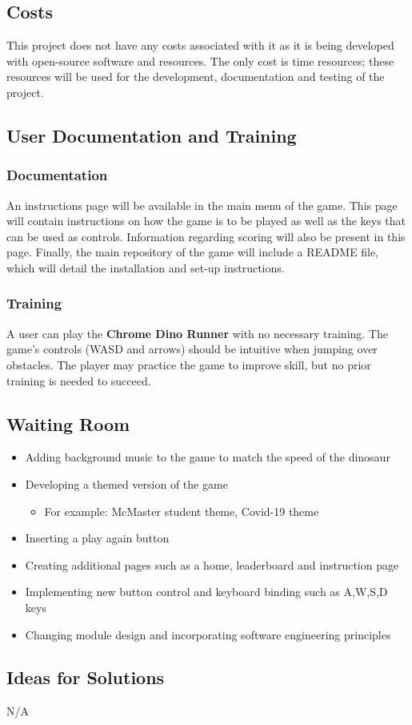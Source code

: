 \documentclass[12pt]{article}
\begin{document}
	\subsection{Costs}
	This project does not have any costs associated with it as it is being developed with open-source software and resources. The only cost is time resources; these resources will be used for the development, documentation and testing of the project. 
	\subsection{User Documentation and Training}
	\subsubsection{Documentation}
	An instructions page will be available in the main menu of the game.
	This page will contain instructions on how the game is to be played as well as the keys that can be used as controls. Information regarding scoring will also be present in this page.
	Finally, the main repository of the game will include a README file, which will detail the installation and set-up instructions.
	\subsubsection{Training}
	A user can play the \textbf{Chrome Dino Runner} with no necessary training. The game's controls (WASD and arrows) should be intuitive when jumping over obstacles. The player may practice the game to improve skill, but no prior training is needed to succeed.  
	\subsection{Waiting Room}
	\begin{itemize}
		\item Adding background music to the game to match the speed of the dinosaur
		\item Developing a themed version of the game 
		\begin{itemize}
			\item For example: McMaster student theme, Covid-19 theme
		\end{itemize}
		\item Inserting a play again button
		\item Creating additional pages such as a home, leaderboard and  instruction page 
		\item Implementing new button control and keyboard binding such as A,W,S,D keys
		\item Changing module design and incorporating software engineering principles
	\end{itemize}
	\subsection{Ideas for Solutions}
	N/A
\end{document}
